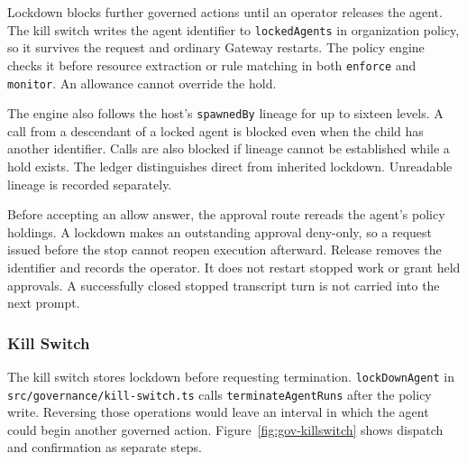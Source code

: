 {\color{red}Lockdown blocks further governed actions until an operator releases the
agent. The kill switch writes the agent identifier to \texttt{lockedAgents}
in organization policy, so it survives the request and ordinary Gateway
restarts. The policy engine checks it before resource extraction or rule
matching in both \texttt{enforce} and \texttt{monitor}. An allowance cannot
override the hold.

The engine also follows the host's \texttt{spawnedBy} lineage for up to sixteen
levels. A call from a descendant of a locked agent is blocked even when the
child has another identifier. Calls are also blocked if lineage cannot be
established while a hold exists. The ledger distinguishes direct from
inherited lockdown. Unreadable lineage is recorded separately.

Before accepting an allow answer, the approval route rereads the agent's
policy holdings. A lockdown makes an outstanding approval deny-only, so a
request issued before the stop cannot reopen execution afterward. Release
removes the identifier and records the operator. It does not restart stopped
work or grant held approvals. A successfully closed stopped transcript turn is
not carried into the next prompt.}

\subsubsection{Kill Switch}
\label{sec:gov-kill-switch}

{\color{red}The kill switch stores lockdown before requesting termination.
\texttt{lockDownAgent} in \texttt{src/governance/kill-switch.ts} calls
\texttt{terminateAgentRuns} after the policy write. Reversing those operations
would leave an interval in which the agent could begin another governed action.
Figure~\ref{fig:gov-killswitch} shows dispatch and confirmation as separate
steps.}

